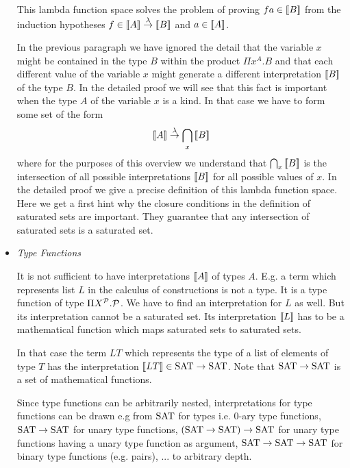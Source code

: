 \begin{itemize}
        This lambda function space solves the problem of proving $fa \in {{[\![}B {]\!]}}$ from the induction hypotheses $f \in {{[\![}A {]\!]}} \stackrel{\lambda}{\to} {{[\![} B {]\!]}}$
        and $a \in {{[\![}A {]\!]}}$.

        In the previous paragraph we have ignored the detail that the variable
        $x$ might be contained in the type $B$ within the product $\Pi x^A.B$
        and that each different value of the variable $x$ might generate a
        different interpretation ${{[\![} B {]\!]}}$ of the type $B$. In the detailed
        proof we will see that this fact is important when the type $A$ of the
        variable $x$ is a kind. In that case we have to form some set of the
        form
        $$
            {{[\![} A {]\!]}} \stackrel{\lambda}{\to} \bigcap_x {{[\![} B {]\!]}}
        $$
        where for the purposes of this overview we understand that $\bigcap_x
        {{[\![} B {]\!]}}$ is the intersection of all possible interpretations ${{[\![} B {]\!]}}$ for all possible values of $x$. In the detailed proof we give a
        precise definition of this lambda function space. Here we get a first
        hint why the closure conditions in the definition of saturated sets are
        important. They guarantee that any intersection of saturated sets is a
        saturated set.


    \item \emph{Type Functions}

        It is not sufficient to have interpretations ${{[\![} A {]\!]}}$ of types $A$.
        E.g. a term which represents list $L$ in the calculus of constructions
        is not a type. It is a type function of type $\Pi X^{\cal P} . {\cal P}$. We
        have to find an interpretation for $L$ as well. But its interpretation
        cannot be a saturated set. Its interpretation ${{[\![} L {]\!]}}$ has to be a
        mathematical function which maps saturated sets to saturated sets.

        In that case the term $L T$ which represents the type of a list of
        elements of type $T$ has the interpretation ${{[\![} L T {]\!]}} \in \text{SAT} \to
        \text{SAT}$. Note that $\text{SAT} \to \text{SAT}$ is a set of mathematical functions.

        Since type functions can be arbitrarily nested, interpretations for type
        functions can be drawn e.g from $\text{SAT}$ for types i.e. $0$-ary type
        functions, $\text{SAT} \to \text{SAT}$ for unary type functions, $(\text{SAT} \to \text{SAT})
        \to \text{SAT}$ for unary type functions having a unary type function as
        argument, $\text{SAT} \to \text{SAT} \to \text{SAT}$ for binary type functions (e.g.
        pairs), ... to arbitrary depth.


\end{itemize}
